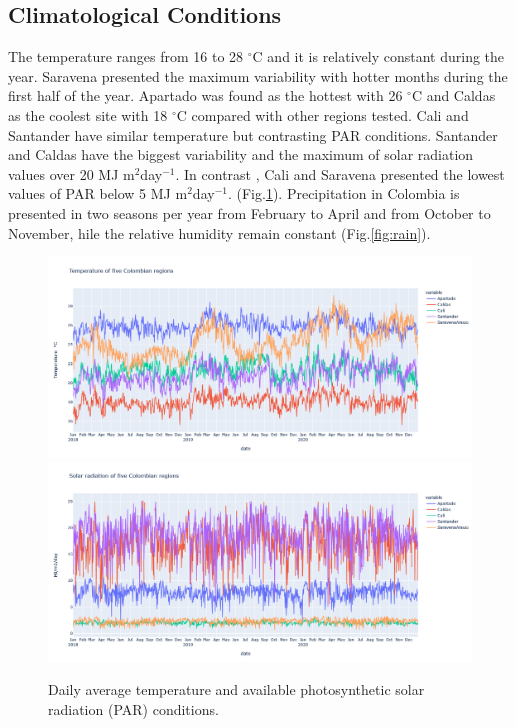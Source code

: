 \documentclass[gene,journal,article,submit,moreauthors,pdftex]{Definitions/mdpi}
\begin{document}
\subsection{Climatological Conditions}
The temperature ranges from 16 to 28 $^\circ$C and it is relatively constant during the year. Saravena presented the maximum variability with hotter months during the first half of the year.  Apartado was found as the hottest with 26 $^\circ$C and Caldas as the coolest site with 18 $^\circ$C compared with other regions tested. Cali and Santander have similar temperature but contrasting PAR conditions. Santander and Caldas have the biggest variability and the maximum of solar radiation values over 20 MJ m$^{2}$day$^{-1}$. In contrast , Cali and Saravena presented the lowest values of PAR below 5 MJ m$^{2}$day$^{-1}$. (Fig.\ref{fig:temp}). Precipitation in Colombia is presented in two seasons per year from February to April and from October to November, hile the relative humidity remain constant (Fig.\ref{fig:rain}).

\begin{figure}[h!]
	\centering
	\caption{\footnotesize {Daily average temperature and available photosynthetic solar radiation (PAR) conditions. \\}}
	\includegraphics[scale=0.25]{images/tempe.png}
	\includegraphics[scale=0.25]{images/SRAD.png}
	\label{fig:temp}
\end{figure}
\end{document}
